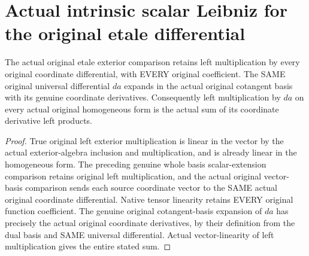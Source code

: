 \section{Actual intrinsic scalar Leibniz for the original etale differential}
\label{sec:etale-differential-leibniz}

\begin{theorem}
\label{lem:cartier-etale-intrinsic-left-wedge}
\leanok
The actual original etale exterior comparison retains left multiplication
by every original coordinate differential, with EVERY original coefficient.
The SAME original universal differential $da$ expands in the actual original
cotangent basis with its genuine coordinate derivatives. Consequently left
multiplication by $da$ on every actual original homogeneous form is the
actual sum of its coordinate derivative left products.
\end{theorem}
\begin{proof}
True original left exterior multiplication is linear in the vector by the
actual exterior-algebra inclusion and multiplication, and is already linear
in the homogeneous form. The preceding genuine whole basis scalar-extension
comparison retains original left multiplication, and the actual original
vector-basis comparison sends each source coordinate vector to the SAME
actual original coordinate differential. Native tensor linearity retains
EVERY original function coefficient. The genuine original cotangent-basis
expansion of $da$ has precisely the actual original coordinate derivatives,
by their definition from the dual basis and SAME universal differential.
Actual vector-linearity of left multiplication gives the entire stated sum.
\end{proof}

